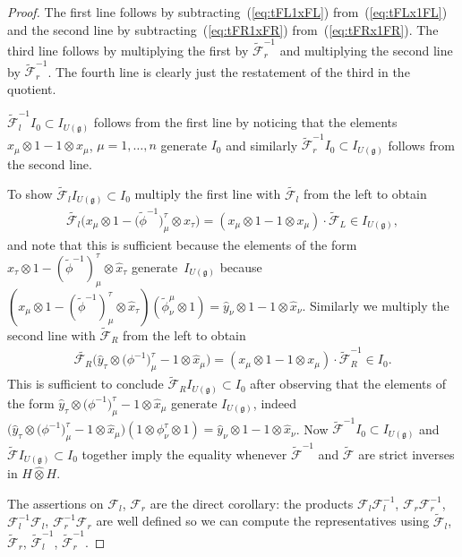 \documentclass[pdftex]{sigma}
\def\gg{\mathfrak{g}}
\def\hx{\hat{x}}
\def\hy{\hat{y}}
\numberwithin{equation}{section}
\begin{document}
\begin{proof} The first line follows by subtracting~(\ref{eq:tFL1xFL}) from~(\ref{eq:tFLx1FL}) and the second line by subtrac\-ting~(\ref{eq:tFR1xFR}) from~(\ref{eq:tFRx1FR}). The third line follows by multiplying the first by $\tilde{\mathcal{F}}_r^{-1}$ and multiplying the second line by $\tilde{\mathcal{F}}_r^{-1}$. The fourth line is clearly just the restatement of the third in the quotient.

$\tilde{\mathcal{F}}_l^{-1} I_0\subset I_{U(\gg)}$ follows from the first line by noticing that the elements $x_\mu\otimes 1-1\otimes x_\mu$, $\mu = 1,\dots,n$ generate $I_0$ and similarly $\tilde{\mathcal{F}}_r^{-1} I_0\subset I_{U(\gg)}$ follows from the second line.

To show $\tilde{\mathcal{F}}_l I_{U(\gg)} \subset I_0$ multiply the first line with $\tilde{\mathcal{F}_l}$ from the left to obtain
\begin{gather*}
\tilde{\mathcal{F}_l}\big(x_\mu\otimes 1 - \big(\tilde\phi^{-1}\big)^\tau_\mu\otimes\hat{x}_\tau\big) = (x_\mu\otimes 1 - 1\otimes x_\mu)\cdot\tilde{\mathcal{F}}_L\in I_{U(\gg)},
\end{gather*}
and note that this is sufficient because the elements of the form $x_\tau\otimes 1 - (\tilde\phi^{-1})^\tau_\mu\otimes\hat{x}_\tau$ genera\-te~$I_{U(\gg)}$ because $(x_\mu\otimes 1 - (\tilde\phi^{-1})^\tau_\mu\otimes\hat{x}_\tau)(\tilde\phi^\mu_\nu\otimes 1) = \hat{y}_\nu\otimes 1 - 1\otimes\hat{x}_\nu$. Similarly we multiply the second line with $\tilde{\mathcal{F}}_R$ from the left to obtain
\begin{gather*}
\tilde{\mathcal{F}_R}\big(\hy_\tau\otimes\big(\phi^{-1}\big)^\tau_\mu- 1\otimes\hx_\mu\big) = (x_\mu\otimes 1 - 1\otimes x_\mu)\cdot\tilde{\mathcal{F}}_R^{-1}\in I_0.
\end{gather*}
This is sufficient to conclude $\tilde{\mathcal{F}}_R I_{U(\gg)}\subset I_0$ after observing that the elements of the form $\hy_\tau\otimes\big(\phi^{-1}\big)^\tau_\mu- 1\otimes\hx_\mu$ generate $I_{U(\gg)}$, indeed $\big(\hy_\tau\otimes\big(\phi^{-1}\big)^\tau_\mu- 1\otimes\hx_\mu\big) (1\otimes\phi^\tau_\nu\otimes 1) = \hy_\nu\otimes 1-1\otimes\hx_\nu$. Now $\tilde{\mathcal{F}}^{-1} I_0\subset I_{U(\gg)}$ and $\tilde{\mathcal{F}}I_{U(\gg)}\subset I_0$ together imply the equality whenever $\tilde{\mathcal{F}}^{-1}$ and $\tilde{\mathcal{F}}$ are strict inverses in $H\hat\otimes H$.

The assertions on $\mathcal{F}_l$, $\mathcal{F}_r$ are the direct corollary: the products $\mathcal{F}_l\mathcal{F}_l^{-1}$, $\mathcal{F}_r\mathcal{F}_r^{-1}$, $\mathcal{F}^{-1}_l\mathcal{F}_l$, $\mathcal{F}^{-1}_r\mathcal{F}_r$ are well defined so we can compute the representatives using $\tilde{\mathcal{F}}_l$, $\tilde{\mathcal{F}}_r$, $\tilde{\mathcal{F}}^{-1}_l$, $\tilde{\mathcal{F}}_r^{-1}$.
\end{proof}
\end{document}
